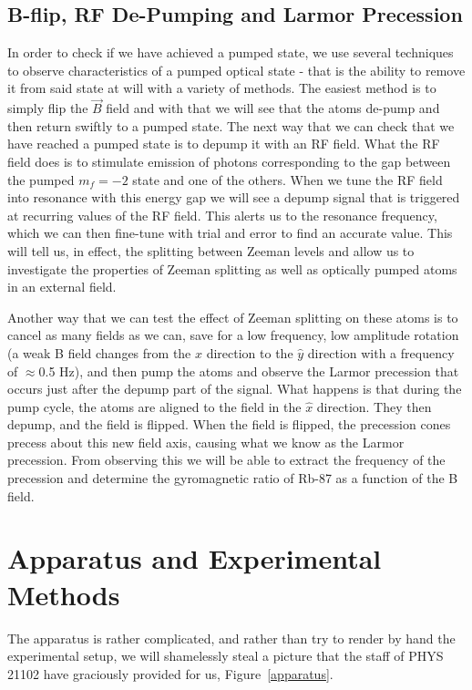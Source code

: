 \documentclass{article}
\begin{document}
  \subsection{B-flip, RF De-Pumping and Larmor Precession}
    In order to check if we have achieved a pumped state, we use several techniques to observe characteristics of a pumped optical state - that is the ability to remove it from said state at will with a variety of methods.  The easiest method is to simply flip the $\vec{B}$ field and with that we will see that the atoms de-pump and then return swiftly to a pumped state.  The next way that we can check that we have reached a pumped state is to depump it with an RF field.  What the RF field does is to stimulate emission of photons corresponding to the gap between the pumped $m_f = -2$ state and one of the others.  When we tune the RF field into resonance with this energy gap we will see a depump signal that is triggered at recurring values of the RF field.  This alerts us to the resonance frequency, which we can then fine-tune with trial and error to find an accurate value.  This will tell us, in effect, the splitting between Zeeman levels and allow us to investigate the properties of Zeeman splitting as well as optically pumped atoms in an external field.

    \hspace{.25cm}

    Another way that we can test the effect of Zeeman splitting on these atoms is to cancel as many fields as we can, save for a low frequency, low amplitude rotation (a weak B field changes from the $\hat{x}$ direction to the $\hat{y}$ direction with a frequency of $\approx$0.5 Hz), and then pump the atoms and observe the Larmor precession that occurs just after the depump part of the signal.  What happens is that during the pump cycle, the atoms are aligned to the field in the $\hat{x}$ direction. They then depump, and the field is flipped.  When the field is flipped, the precession cones precess about this new field axis, causing what we know as the Larmor precession.  From observing this we will be able to extract the frequency of the precession and determine the gyromagnetic ratio of Rb-87 as a function of the B field.
\section{Apparatus and Experimental Methods}%
  The apparatus is rather complicated, and rather than try to render by hand the experimental setup, we will shamelessly steal a picture that the staff of PHYS 21102 have graciously provided for us, Figure~\ref{apparatus}.
\end{document}
